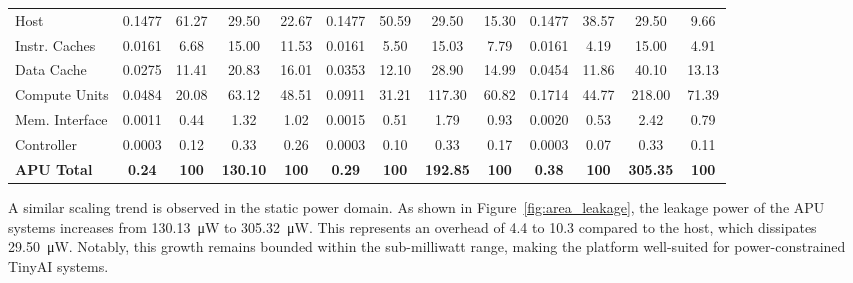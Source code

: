 \begin{table}[tp]
{\begin{tabular}{|l|c c c c|c c c c|c c c c|}
                    \midrule           
                    Host                  & 0.1477   & 61.27    & 29.50     & 22.67 
                                          & 0.1477   & 50.59    & 29.50     & 15.30
                                          & 0.1477   & 38.57    & 29.50     & 9.66 \\
                    Instr. Caches         & 0.0161   & 6.68     & 15.00     & 11.53 
                                          & 0.0161   & 5.50     & 15.03     & 7.79 
                                          & 0.0161   & 4.19     & 15.00     & 4.91 \\
                    Data Cache            & 0.0275   & 11.41    & 20.83     & 16.01 
                                          & 0.0353   & 12.10    & 28.90     & 14.99 
                                          & 0.0454   & 11.86    & 40.10     & 13.13 \\
                    Compute Units         & 0.0484   & 20.08    & 63.12     & 48.51 
                                          & 0.0911   & 31.21    & 117.30    & 60.82 
                                          & 0.1714   & 44.77    & 218.00    & 71.39 \\
                    Mem. Interface        & 0.0011   & 0.44     & 1.32      & 1.02 
                                          & 0.0015   & 0.51     & 1.79      & 0.93  
                                          & 0.0020   & 0.53     & 2.42      & 0.79  \\
                    Controller            & 0.0003   & 0.12     & 0.33      & 0.26  
                                          & 0.0003   & 0.10     & 0.33      & 0.17  
                                          & 0.0003   & 0.07     & 0.33      & 0.11  \\
                    \midrule
                        \bf APU Total     & \textbf{0.24}     & \textbf{100}      & \textbf{130.10}    & \textbf{100} 
                                          & \textbf{0.29}     & \textbf{100}      & \textbf{192.85}    & \textbf{100} 
                                          & \textbf{0.38}     & \textbf{100}      & \textbf{305.35}    & \textbf{100} \\
                    \bottomrule
                \end{tabular}
                }
            \end{table}
        
            A similar scaling trend is observed in the static power domain. As shown in Figure~\ref{fig:area_leakage}, the leakage power of the APU systems increases from \SI{130.13}{\micro\watt} to \SI{305.32}{\micro\watt}. This represents an overhead of \SI{4.4}{\times} to \SI{10.3}{\times} compared to the host, which dissipates \SI{29.50}{\micro\watt}. Notably, this growth remains bounded within the sub-milliwatt range, making the platform well-suited for power-constrained TinyAI systems.
        
